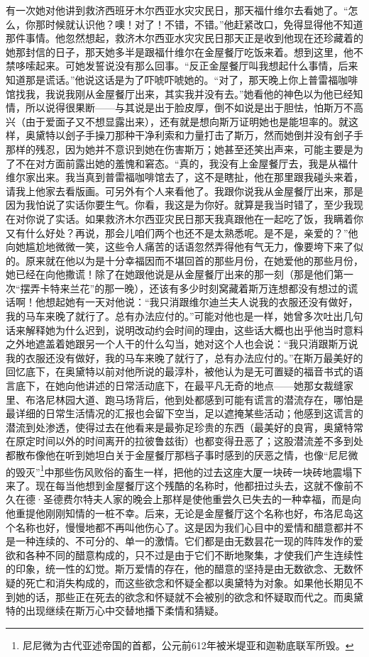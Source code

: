 \par 有一次她对他讲到救济西班牙木尔西亚水灾灾民日，那天福什维尔去看她了。“怎么，你那时候就认识他？噢！对了！不错，不错。”他赶紧改口，免得显得他不知道那件事情。他忽然想起，救济木尔西亚水灾灾民日那天正是收到他现在还珍藏着的她那封信的日子，那天她多半是跟福什维尔在金屋餐厅吃饭来着。想到这里，他不禁哆嗦起来。可她发誓说没有那么回事。“反正金屋餐厅叫我想起什么事情，后来知道那是谎话。”他说这话是为了吓唬吓唬她的。“对了，那天晚上你上普雷福咖啡馆找我，我说我刚从金屋餐厅出来，其实我并没有去。”她看他的神色以为他已经知情，所以说得很果断——与其说是出于脸皮厚，倒不如说是出于胆怯，怕斯万不高兴（由于爱面子又不想显露出来），还有就是想向斯万证明她也是能坦率的。就这样，奥黛特以刽子手操刀那种干净利索和力量打击了斯万，然而她倒并没有刽子手那样的残忍，因为她并不意识到她在伤害斯万；她甚至还笑出声来，可能主要是为了不在对方面前露出她的羞愧和窘态。“真的，我没有上金屋餐厅去，我是从福什维尔家出来。我当真到普雷福咖啡馆去了，这不是瞎扯，他在那里跟我碰头来着，请我上他家去看版画。可另外有个人来看他了。我跟你说我从金屋餐厅出来，那是因为我怕说了实话你要生气。你看，我这是为你好。就算是我当时错了，至少我现在对你说了实话。如果救济木尔西亚灾民日那天我真跟他在一起吃了饭，我瞒着你又有什么好处？再说，那会儿咱们两个也还不是太熟悉呢。是不是，亲爱的？”他向她尴尬地微微一笑，这些令人痛苦的话语忽然弄得他有气无力，像要垮下来了似的。原来就在他以为是十分幸福因而不堪回首的那些月份，在她爱他的那些月份，她已经在向他撒谎！除了在她跟他说是从金屋餐厅出来的那一刻（那是他们第一次“摆弄卡特来兰花”的那一晚），还该有多少时刻窝藏着斯万连想都没有想过的谎话啊！他想起她有一天对他说：“我只消跟维尔迪兰夫人说我的衣服还没有做好，我的马车来晚了就行了。总有办法应付的。”可能对他也是一样，她曾多次吐出几句话来解释她为什么迟到，说明改动约会时间的理由，这些话大概也出乎他当时意料之外地遮盖着她跟另一个人干的什么勾当，她对这个人也会说：“我只消跟斯万说我的衣服还没有做好，我的马车来晚了就行了，总有办法应付的。”在斯万最美好的回忆底下，在奥黛特以前对他所说的最淳朴，被他认为是无可置疑的福音书式的语言底下，在她向他讲述的日常活动底下，在最平凡无奇的地点——她那女裁缝家里、布洛尼林园大道、跑马场背后，他到处都感到可能有谎言的潜流存在，哪怕是最详细的日常生活情况的汇报也会留下空当，足以遮掩某些活动；他感到这谎言的潜流到处渗透，使得过去在他看来是最弥足珍贵的东西（最美好的良宵，奥黛特常在原定时间以外的时间离开的拉彼鲁兹街）也都变得丑恶了；这股潜流差不多到处都散布像他在听到她坦白关于金屋餐厅那档子事时感到的厌恶之情，也像“尼尼微的毁灭”\footnote{尼尼微为古代亚述帝国的首都，公元前612年被米堤亚和迦勒底联军所毁。}中那些伤风败俗的畜生一样，把他的过去这座大厦一块砖一块砖地震塌下来了。现在每当他想到金屋餐厅这个残酷的名称时，他都扭过头去，这就不像前不久在德·圣德费尔特夫人家的晚会上那样是使他重尝久已失去的一种幸福，而是向他重提他刚刚知情的一桩不幸。后来，无论是金屋餐厅这个名称也好，布洛尼岛这个名称也好，慢慢地都不再叫他伤心了。这是因为我们心目中的爱情和醋意都并不是一种连续的、不可分的、单一的激情。它们都是由无数昙花一现的阵阵发作的爱欲和各种不同的醋意构成的，只不过是由于它们不断地聚集，才使我们产生连续性的印象，统一性的幻觉。斯万爱情的存在，他的醋意的坚持是由无数欲念、无数怀疑的死亡和消失构成的，而这些欲念和怀疑全都以奥黛特为对象。如果他长期见不到她的话，那些正在死去的欲念和怀疑就不会被别的欲念和怀疑取而代之。而奥黛特的出现继续在斯万心中交替地播下柔情和猜疑。
